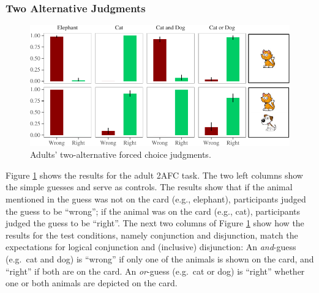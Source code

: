 \documentclass[oneside]{report}
\theoremstyle{definition}
\theoremstyle{definition}
\theoremstyle{definition}
\theoremstyle{remark}
\begin{document}
\subsubsection{Two Alternative
Judgments}\label{two-alternative-judgments}
\begin{figure}[t]

{\centering \includegraphics{figs/binaryAdultsPlot-1} 

}

\caption{Adults' two-alternative forced choice judgments.}\label{fig:binaryAdultsPlot}
\end{figure}
Figure \ref{fig:binaryAdultsPlot} shows the results for the adult 2AFC
task. The two left columns show the simple guesses and serve as
controls. The results show that if the animal mentioned in the guess was
not on the card (e.g., elephant), participants judged the guess to be
``wrong''; if the animal was on the card (e.g., cat), participants
judged the guess to be ``right''. The next two columns of Figure
\ref{fig:binaryAdultsPlot} show how the results for the test conditions,
namely conjunction and disjunction, match the expectations for logical
conjunction and (inclusive) disjunction: An \emph{and}-guess (e.g.~cat
and dog) is ``wrong'' if only one of the animals is shown on the card,
and ``right'' if both are on the card. An \emph{or}-guess (e.g.~cat or
dog) is ``right'' whether one or both animals are depicted on the card.
\end{document}
